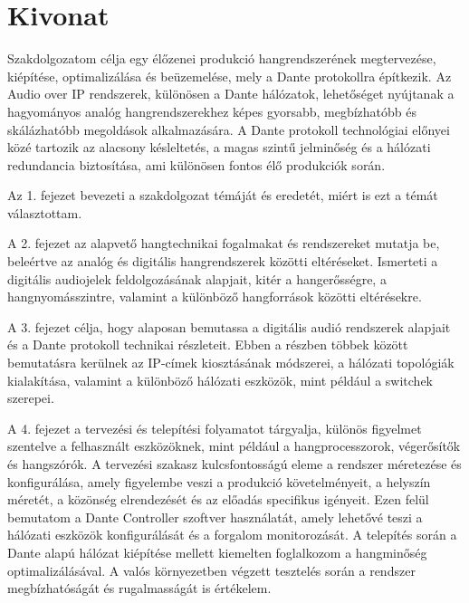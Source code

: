 \setcounter{page}{1}

\selecthungarian

\chapter*{Kivonat}

Szakdolgozatom célja egy élőzenei produkció hangrendszerének megtervezése, 
kiépítése, optimalizálása és beüzemelése, mely a Dante protokollra 
építkezik. Az Audio over IP rendszerek, különösen a Dante hálózatok, 
lehetőséget nyújtanak a hagyományos analóg hangrendszerekhez 
képes gyorsabb, megbízhatóbb és skálázhatóbb megoldások alkalmazására. 
A Dante protokoll technológiai előnyei közé tartozik az alacsony 
késleltetés, a magas szintű jelminőség és a hálózati redundancia 
biztosítása, ami különösen fontos élő produkciók során.

Az 1. fejezet bevezeti a szakdolgozat témáját és eredetét,
miért is ezt a témát választottam.

A 2. fejezet az alapvető hangtechnikai fogalmakat és rendszereket 
mutatja be, beleértve az analóg és digitális hangrendszerek 
közötti eltéréseket. Ismerteti a digitális audiojelek 
feldolgozásának alapjait, kitér a hangerősségre, a hangnyomásszintre, valamint a 
különböző hangforrások közötti eltérésekre. 

A 3. fejezet célja, hogy alaposan bemutassa a digitális audió 
rendszerek alapjait és a Dante protokoll technikai részleteit. 
Ebben a részben többek között bemutatásra kerülnek az IP-címek kiosztásának módszerei, 
a hálózati topológiák kialakítása, 
valamint a különböző hálózati eszközök, mint például a switchek szerepei.

A 4. fejezet a tervezési és telepítési folyamatot tárgyalja, 
különös figyelmet szentelve a felhasznált eszközöknek, 
mint például a hangprocesszorok, végerősítők és 
hangszórók. A tervezési szakasz kulcsfontosságú eleme a
rendszer méretezése és konfigurálása, amely figyelembe 
veszi a produkció követelményeit, a helyszín 
méretét, a közönség elrendezését és az előadás 
specifikus igényeit. Ezen felül bemutatom a Dante 
Controller szoftver használatát, amely lehetővé teszi a 
hálózati eszközök konfigurálását és a forgalom 
monitorozását. 
A telepítés során a Dante alapú hálózat  kiépítése mellett kiemelten
foglalkozom a hangminőség optimalizálásával. A valós környezetben 
végzett tesztelés során a rendszer megbízhatóságát és 
rugalmasságát is értékelem.

